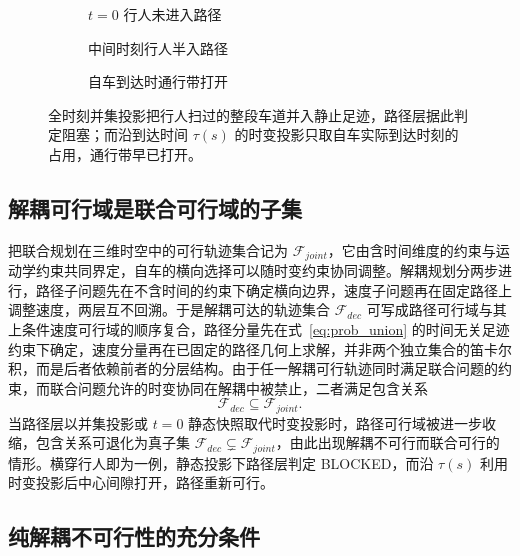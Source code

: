 \documentclass[a4paper,11pt]{ctexart}
\theoremstyle{definition}
\begin{document}
\begin{figure}[htbp]
\centering
\begin{subfigure}[b]{0.32\textwidth}
  \centering
  \caption{$t{=}0$ 行人未进入路径}
\end{subfigure}\hfill
\begin{subfigure}[b]{0.32\textwidth}
  \centering
  \caption{中间时刻行人半入路径}
\end{subfigure}\hfill
\begin{subfigure}[b]{0.32\textwidth}
  \centering
  \caption{自车到达时通行带打开}
\end{subfigure}
\caption{横穿行人场景下的时间盲信息断裂}
\caption*{全时刻并集投影把行人扫过的整段车道并入静止足迹，路径层据此判定阻塞；而沿到达时间 $\tau(s)$ 的时变投影只取自车实际到达时刻的占用，通行带早已打开。}
\label{fig:dynamic_exclusion}
\end{figure}

\subsection{解耦可行域是联合可行域的子集}
\label{subsec:feasibility_subset}

把联合规划在三维时空中的可行轨迹集合记为 $\mathcal{F}_{joint}$，它由含时间维度的约束与运动学约束共同界定，自车的横向选择可以随时变约束协同调整。解耦规划分两步进行，路径子问题先在不含时间的约束下确定横向边界，速度子问题再在固定路径上调整速度，两层互不回溯。于是解耦可达的轨迹集合 $\mathcal{F}_{dec}$ 可写成路径可行域与其上条件速度可行域的顺序复合，路径分量先在式~\eqref{eq:prob_union} 的时间无关足迹约束下确定，速度分量再在已固定的路径几何上求解，并非两个独立集合的笛卡尔积，而是后者依赖前者的分层结构。由于任一解耦可行轨迹同时满足联合问题的约束，而联合问题允许的时变协同在解耦中被禁止，二者满足包含关系
\begin{equation}
    \mathcal{F}_{dec} \subseteq \mathcal{F}_{joint}.
    \label{eq:prob_subset}
\end{equation}
当路径层以并集投影或 $t{=}0$ 静态快照取代时变投影时，路径可行域被进一步收缩，包含关系可退化为真子集 $\mathcal{F}_{dec} \subsetneq \mathcal{F}_{joint}$，由此出现解耦不可行而联合可行的情形。横穿行人即为一例，静态投影下路径层判定 BLOCKED，而沿 $\tau(s)$ 利用时变投影后中心间隙打开，路径重新可行。

\subsection{纯解耦不可行性的充分条件}
\label{subsec:infeasibility_condition}
\end{document}
